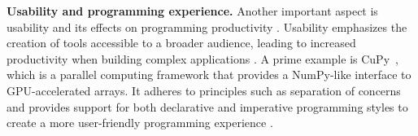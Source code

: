 \textbf{Usability and programming experience.}
Another important aspect is usability and its effects on programming productivity .
Usability emphasizes the creation of tools accessible to a broader audience, leading to increased
productivity when building complex applications . A prime example
is CuPy~\cite{okuta_cupy_2017}, which is a parallel computing framework that provides a NumPy-like
interface to GPU-accelerated arrays. It adheres to principles such as separation of concerns and
provides support for both declarative and imperative programming styles to create a more user-friendly programming
experience .





